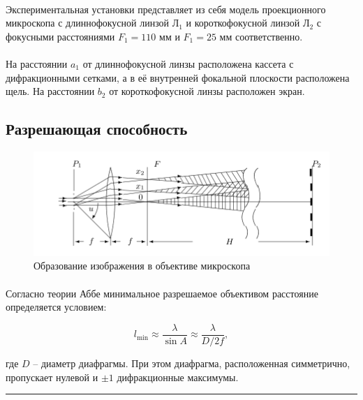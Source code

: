\documentclass[a4paper,12pt]{article} %
\begin{document}
\paragraph{} Экспериментальная установки представляет из себя модель проекционного микроскопа с длиннофокусной линзой Л$_1$  и короткофокусной линзой Л$_2$ с фокусными расстояниями $F_1 = 110$ мм и $F_1 = 25$ мм соответственно. 

\paragraph{} На расстоянии $a_1$ от длиннофокусной линзы расположена кассета с дифракционными сетками, а в её внутренней фокальной плоскости расположена щель. На расстоянии $b_2$ от короткофокусной линзы расположен экран.

\subsection{Разрешающая способность}

\begin{figure}
\centering
\includegraphics[width=\textwidth]{image.png}
\caption{Образование изображения в объективе микроскопа}
\label{fig:image}
\end{figure}

\paragraph{} Согласно теории Аббе минимальное разрешаемое объективом расстояние определяется условием:

\begin{equation}
l_{\min{}} \approx \frac{\lambda}{\sin A} \approx \frac{\lambda}{D / 2f},
\label{e:abbe}
\end{equation}

\noindent где $D$ -- диаметр диафрагмы. При этом диафрагма, расположенная симметрично, пропускает нулевой и $\pm 1$ дифракционные максимумы.

\medskip\hrule\medskip
\end{document}
